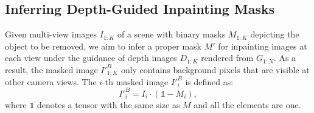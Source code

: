 




\subsection{Inferring Depth-Guided Inpainting Masks}
\label{subsub:mask reduce}
Given multi-view images $I_{1:K}$ of a scene with binary masks $M_{1:K}$ depicting the object to be removed, we aim to infer a proper mask $M'$ for inpainting images at each view under the guidance of depth images $D_{1:K}$ rendered from $G_{1:N}$. As a result, the masked image $I'^B_{1:K}$
only contains background pixels that are visible at other camera views. The $i$-th masked image $I'^B_i$ is defined as:
\begin{equation}
    I'^B_i = I_i \cdot (\mathds{1}-M_i),
\end{equation}
where $\mathds{1}$ denotes a tensor with the same size as $M$ and all the elements are one.

